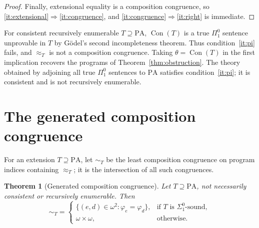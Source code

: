 \documentclass[11pt]{article}
\newtheorem{theorem}{Theorem}
\newcommand{\PA}{\mathrm{PA}}
\newcommand{\Con}{\operatorname{Con}}
\begin{document}
\begin{proof}
Finally, extensional equality is a composition congruence, so
\ref{it:extensional}$\Rightarrow$\ref{it:congruence}, and
\ref{it:congruence}$\Rightarrow$\ref{it:right} is immediate.
\end{proof}

For consistent recursively enumerable $T\supseteq\PA$,
$\Con(T)$ is a true $\Pi^0_1$ sentence unprovable in $T$ by
G\"odel's second incompleteness theorem. Thus condition~\ref{it:pi}
fails, and $\approx_T$ is not a composition congruence.
Taking $\theta=\Con(T)$ in the first implication recovers the
programs of Theorem~\ref{thm:obstruction}.
The theory obtained by adjoining all true $\Pi^0_1$ sentences to
$\PA$ satisfies condition~\ref{it:pi}; it is consistent and is not
recursively enumerable.

\section{The generated composition congruence}\label{sec:generated}

For an extension $T\supseteq\PA$, let $\sim_T$ be the least
composition congruence on program indices containing $\approx_T$;
it is the intersection of all such congruences.

\begin{theorem}[Generated composition congruence]\label{thm:generated-congruence}
Let $T\supseteq\PA$, not necessarily consistent or recursively enumerable.
Then
\[
 {\sim_T}=
 \begin{cases}
 \{(e,d)\in\omega^2:\varphi_e=\varphi_d\},
       &\text{if $T$ is $\Sigma^0_1$-sound},\\
 \omega\times\omega,&\text{otherwise}.
 \end{cases}
\]
\end{theorem}
\end{document}
